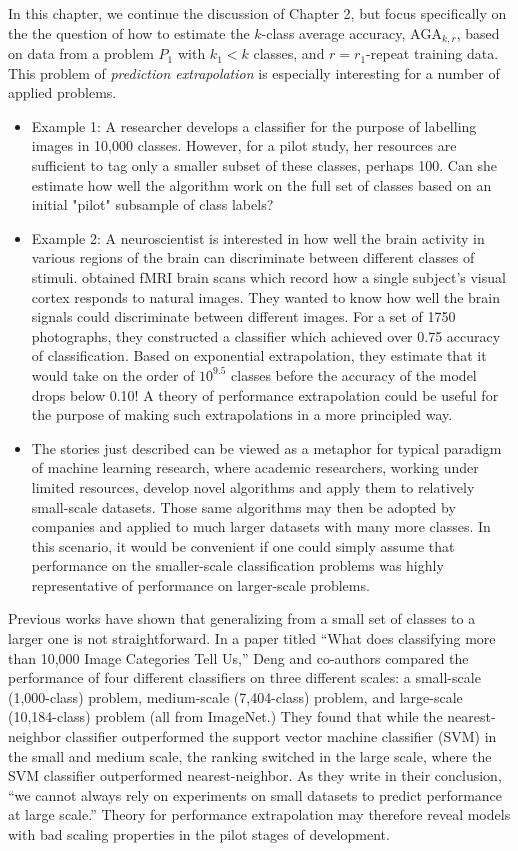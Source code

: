 \documentclass[12pt]{article}
\begin{document}
In this chapter, we continue the discussion of Chapter 2, but focus
specifically on the the question of how to estimate the $k$-class
average accuracy, $\text{AGA}_{k, r}$, based on data from a problem
$P_1$ with $k_1 < k$ classes, and $r = r_1$-repeat training data.
This problem of \emph{prediction extrapolation} is especially
interesting for a number of applied problems.

\begin{itemize} 
\item Example 1: A researcher develops a classifier for the purpose of labelling
images in 10,000 classes. However, for a pilot study, her resources are sufficient to 
tag only a smaller subset of these classes, perhaps 100. Can she estimate how well the algorithm 
work on the full set of classes based on an initial "pilot" subsample of class labels?
\item Example 2: A neuroscientist is interested in how well the brain
  activity in various regions of the brain can discriminate between
  different classes of stimuli.  \cite{Kay2008a} obtained fMRI brain
  scans which record how a single subject's visual cortex responds to
  natural images. They wanted to know how well the brain signals could
  discriminate between different images. For a set of 1750
  photographs, they constructed a classifier which achieved over 0.75
  accuracy of classification. Based on exponential extrapolation, they
  estimate that it would take on the order of $10^{9.5}$ classes
  before the accuracy of the model drops below 0.10!  A theory of
  performance extrapolation could be useful for the purpose of making
  such extrapolations in a more principled way.
\item The stories just described can be viewed as a metaphor for
  typical paradigm of machine learning research, where academic
  researchers, working under limited resources, develop novel
  algorithms and apply them to relatively small-scale datasets. Those
  same algorithms may then be adopted by companies and applied to much
  larger datasets with many more classes. In this scenario, it would
  be convenient if one could simply assume that performance on the
  smaller-scale classification problems was highly representative of
  performance on larger-scale problems.
\end{itemize}

Previous works have shown that generalizing from a small set of
classes to a larger one is not straightforward. In a paper titled
``What does classifying more than 10,000 Image Categories Tell Us,''
Deng and co-authors compared the performance of four different
classifiers on three different scales: a small-scale (1,000-class)
problem, medium-scale (7,404-class) problem, and large-scale
(10,184-class) problem (all from ImageNet.)  They found that while the
nearest-neighbor classifier outperformed the support vector machine
classifier (SVM) in the small and medium scale, the ranking switched
in the large scale, where the SVM classifier outperformed
nearest-neighbor.  As they write in their conclusion, ``we cannot
always rely on experiments on small datasets to predict performance at
large scale.'' Theory for performance extrapolation may therefore
reveal models with bad scaling properties in the pilot stages of
development.
\end{document}
